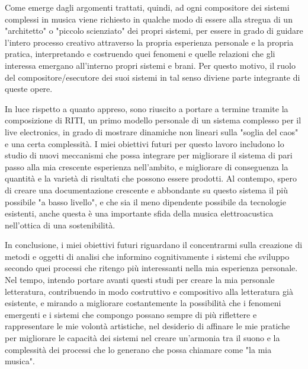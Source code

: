 Come emerge dagli argomenti trattati, quindi, ad ogni compositore dei sistemi complessi in musica 
viene richiesto in qualche modo di essere alla stregua di un "architetto" o "piccolo scienziato" dei propri sistemi,
per essere in grado di guidare l'intero processo creativo 
attraverso la propria esperienza personale e la propria pratica, 
interpretando e costruendo quei fenomeni e quelle relazioni che gli interessa emergano 
all'interno propri sistemi e brani.
Per questo motivo, il ruolo del compositore/esecutore dei suoi sistemi 
in tal senso diviene parte integrante di queste opere.

In luce rispetto a quanto appreso, 
sono riuscito a portare a termine tramite la composizione di RITI, un primo modello personale 
di un sistema complesso per il live electronics,
in grado di mostrare dinamiche non lineari sulla "soglia del caos" e una certa complessità.
I miei obiettivi futuri per questo lavoro includono lo studio di nuovi 
meccanismi che possa integrare per migliorare il sistema di pari passo alla mia crescente esperienza nell'ambito,
e migliorare di conseguenza la quantità e la varietà di risultati che possono essere prodotti.
Al contempo, spero di creare una documentazione crescente e abbondante su questo sistema 
il più possibile "a basso livello", e che sia il meno dipendente possibile da tecnologie esistenti,
anche questa è una importante sfida della musica elettroacustica nell'ottica 
di una sostenibilità.

In conclusione, i miei obiettivi futuri riguardano il concentrarmi 
sulla creazione di metodi e oggetti di analisi che informino cognitivamente 
i sistemi che sviluppo secondo quei processi che ritengo più interessanti nella mia esperienza personale. 
Nel tempo, intendo portare avanti questi studi per creare la mia personale letteratura, 
contribuendo in modo costruttivo e compositivo alla letteratura già esistente,
e mirando a migliorare costantemente la possibilità 
che i fenomeni emergenti e i sistemi che compongo
possano sempre di più riflettere e rappresentare le mie volontà artistiche, 
nel desiderio di affinare le mie pratiche per migliorare le capacità 
dei sistemi nel creare un'armonia tra il suono e la complessità dei processi che lo generano 
che possa chiamare come "la mia musica".